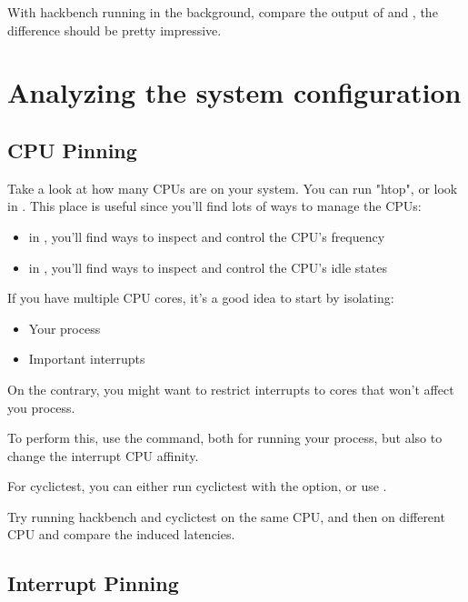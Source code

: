 
With hackbench running in the background, compare the output of  and , the
difference should be pretty impressive.

\section{Analyzing the system configuration}

\subsection{CPU Pinning}

Take a look at how many CPUs are on your system. You can run "htop", or
look in . This place is useful since you'll find
lots of ways to manage the CPUs:

\begin{itemize}
        \item in , you'll find ways to inspect and control the CPU's frequency
        \item in , you'll find ways to inspect and control the CPU's idle states
\end{itemize}

If you have multiple CPU cores, it's a good idea to start by isolating:
\begin{itemize}
        \item Your process
        \item Important interrupts
\end{itemize}

On the contrary, you might want to restrict interrupts to cores that won't affect
you process.

To perform this, use the  command, both for running your process, but
also to change the interrupt CPU affinity.

For cyclictest, you can either run cyclictest with the  option,
or use .

Try running hackbench and cyclictest on the same CPU, and then on different CPU and
compare the induced latencies.

\subsection{Interrupt Pinning}


